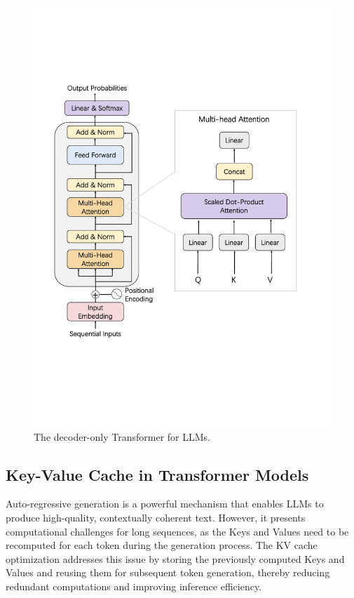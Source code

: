  \begin{figure}[t]
    \centering
    \includegraphics[width=0.88\linewidth]{figures/transfomer.pdf}
    \caption{The decoder-only Transformer for LLMs.}
    \label{fig:transformer}
\end{figure}


 


 

\subsection{Key-Value Cache in Transformer Models}\label{ssec:kv_cache}
Auto-regressive generation is a powerful mechanism that enables LLMs to produce high-quality, contextually coherent text. 
However, it presents computational challenges for long sequences, as the Keys and Values need to be recomputed for each token during the generation process. The KV cache optimization addresses this issue by storing the previously computed Keys and Values and reusing them for subsequent token generation, thereby reducing redundant computations and improving inference efficiency.


